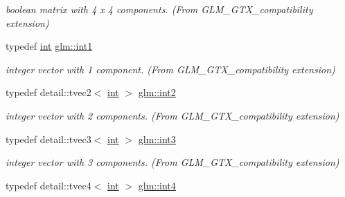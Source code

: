 \begin{DoxyCompactItemize}
\begin{DoxyCompactList}\small\item\em boolean matrix with 4 x 4 components. (From G\+L\+M\+\_\+\+G\+T\+X\+\_\+compatibility extension) \end{DoxyCompactList}\item 
\hypertarget{group__gtx__compatibility_gaba41d7803e4b24c17656d74377b88286}{}typedef \hyperlink{_s_d_l__thread_8h_a6a64f9be4433e4de6e2f2f548cf3c08e}{int} \hyperlink{group__gtx__compatibility_gaba41d7803e4b24c17656d74377b88286}{glm\+::int1}\label{group__gtx__compatibility_gaba41d7803e4b24c17656d74377b88286}

\begin{DoxyCompactList}\small\item\em integer vector with 1 component. (From G\+L\+M\+\_\+\+G\+T\+X\+\_\+compatibility extension) \end{DoxyCompactList}\item 
\hypertarget{group__gtx__compatibility_ga453bda6cd123e170a000e55f3c0fc3a7}{}typedef detail\+::tvec2$<$ \hyperlink{_s_d_l__thread_8h_a6a64f9be4433e4de6e2f2f548cf3c08e}{int} $>$ \hyperlink{group__gtx__compatibility_ga453bda6cd123e170a000e55f3c0fc3a7}{glm\+::int2}\label{group__gtx__compatibility_ga453bda6cd123e170a000e55f3c0fc3a7}

\begin{DoxyCompactList}\small\item\em integer vector with 2 components. (From G\+L\+M\+\_\+\+G\+T\+X\+\_\+compatibility extension) \end{DoxyCompactList}\item 
\hypertarget{group__gtx__compatibility_ga5203a85e1b4808a8d95f83a33e95f52f}{}typedef detail\+::tvec3$<$ \hyperlink{_s_d_l__thread_8h_a6a64f9be4433e4de6e2f2f548cf3c08e}{int} $>$ \hyperlink{group__gtx__compatibility_ga5203a85e1b4808a8d95f83a33e95f52f}{glm\+::int3}\label{group__gtx__compatibility_ga5203a85e1b4808a8d95f83a33e95f52f}

\begin{DoxyCompactList}\small\item\em integer vector with 3 components. (From G\+L\+M\+\_\+\+G\+T\+X\+\_\+compatibility extension) \end{DoxyCompactList}\item 
\hypertarget{group__gtx__compatibility_gac82a67168aa7b8cb4590567e645c58c5}{}typedef detail\+::tvec4$<$ \hyperlink{_s_d_l__thread_8h_a6a64f9be4433e4de6e2f2f548cf3c08e}{int} $>$ \hyperlink{group__gtx__compatibility_gac82a67168aa7b8cb4590567e645c58c5}{glm\+::int4}\label{group__gtx__compatibility_gac82a67168aa7b8cb4590567e645c58c5}


\end{DoxyCompactItemize}

